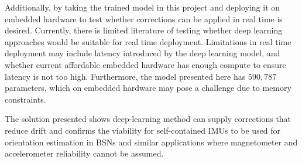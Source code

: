 Additionally, by taking the trained model in this project and deploying it on embedded hardware to test whether 
corrections can be applied in real time is desired. Currently, there is limited literature of testing whether deep learning approaches would be suitable for real time deployment. Limitations in
real time deployment may include latency introduced by the deep learning model, and whether current affordable embedded hardware has enough compute to ensure latency is not too high. Furthermore, 
the model presented here has $590,787$ parameters, which on embedded hardware may pose a challenge due to memory constraints.   

The solution presented shows deep-learning method can supply corrections that reduce drift 
and confirms the viability for self-contained IMUs to be used for orientation estimation in BSNs and similar applications where magnetometer and accelerometer 
reliability cannot be assumed. 


